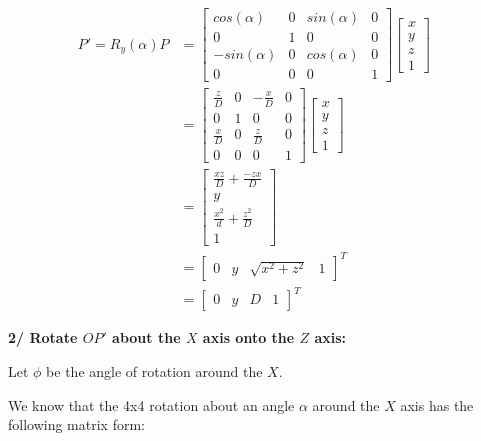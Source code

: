 \documentclass[a4paper,10pt]{article}
\begin{document}
\begin{equation}
\left.\begin{aligned}
P' = R_y(\alpha)P 
&=
\begin{bmatrix}
	cos(\alpha)  & 0 & sin(\alpha) & 0 \\
	0 			 & 1 & 0		   & 0 \\
	-sin(\alpha) & 0 & cos(\alpha) & 0 \\
	0 			 & 0 & 0 		   & 1
\end{bmatrix}
\begin{bmatrix}
x \\ y \\ z \\ 1
\end{bmatrix}&\\
&=
\begin{bmatrix}
	\frac{z}{D}  & 0 & -\frac{x}{D} & 0 \\
	0 			 & 1 & 0		    & 0 \\
	\frac{x}{D}  & 0 & \frac{z}{D}  & 0 \\
	0 			 & 0 & 0 		    & 1
\end{bmatrix}
\begin{bmatrix}
x \\ y \\ z \\ 1
\end{bmatrix}&\\
&=
\begin{bmatrix}
\frac{xz}{D} + \frac{-zx}{D} \\
 y \\ 
 \frac{x^2}{d} + \frac{z^2}{D} \\ 
 1
\end{bmatrix}&\\
&=
\begin{bmatrix}
0 & y & \sqrt{x^2 + z^2} & 1
\end{bmatrix}^{T}&\\
&=
\begin{bmatrix}
0 & y & D & 1
\end{bmatrix}^{T}&
\end{aligned}\right.
\end{equation}


\pagebreak
\noindent
\textbf{2/ Rotate $OP'$ about the $X$ axis onto the $Z$ axis:}


\bigskip \noindent
Let $\phi$ be the angle of rotation around the $X$.

\bigskip \noindent
We know that the 4x4 rotation about an angle $\alpha$ around the $X$ axis has the following matrix form:
\end{document}
